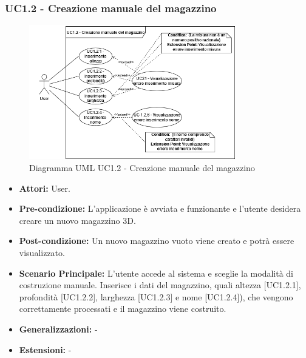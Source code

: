 \subsubsection{UC1.2 - Creazione manuale del magazzino}
\begin{figure}[H]
    \centering
    \includegraphics[width=0.8\textwidth]{UC_diagrams_1-10/UC1.2.drawio.png}
    \caption{Diagramma UML UC1.2 - Creazione manuale del magazzino}
\end{figure}
\begin{itemize}
    \item \textbf{Attori:} User.
    \item \textbf{Pre-condizione:} L'applicazione è avviata e funzionante e l'utente desidera creare un nuovo magazzino 3D.
    \item \textbf{Post-condizione:} Un nuovo magazzino vuoto viene creato e potrà essere visualizzato.
    \item \textbf{Scenario Principale:}  L’utente accede al sistema e sceglie la modalità di costruzione manuale. Inserisce i dati del magazzino, quali altezza [UC1.2.1], profondità [UC1.2.2], larghezza [UC1.2.3] e nome [UC1.2.4]), che vengono correttamente processati e il magazzino viene costruito.
    \item \textbf{Generalizzazioni:} -
    \item \textbf{Estensioni:} -
\end{itemize}


